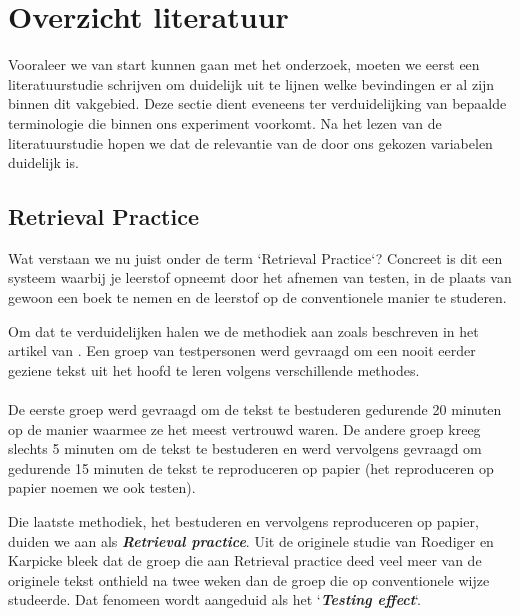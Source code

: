 \documentclass{hogent-article}
\newcommand{\boldit}[1]{\emph{\textbf{#1}}}
\begin{document}
\section{Overzicht literatuur}

Vooraleer we van start kunnen gaan met het onderzoek, moeten we eerst een literatuurstudie schrijven om duidelijk uit te lijnen welke bevindingen er al zijn binnen dit vakgebied. Deze sectie dient eveneens ter verduidelijking van bepaalde terminologie die binnen ons experiment voorkomt. Na het lezen van de literatuurstudie hopen we dat de relevantie van de door ons gekozen variabelen duidelijk is.

\subsection{Retrieval Practice}
\label{RetrievalPractice}
Wat verstaan we nu juist onder de term `Retrieval Practice`? Concreet is dit een systeem waarbij je leerstof opneemt door het afnemen van testen, in de plaats van gewoon een boek te nemen en de leerstof op de conventionele manier te studeren.\\
\par
\noindent
Om dat te verduidelijken halen we de methodiek aan zoals beschreven in het artikel van \textcite{Roediger_2006}. Een groep van testpersonen werd gevraagd om een nooit eerder geziene tekst uit het hoofd te leren volgens verschillende methodes.\\\\De eerste groep werd gevraagd om de tekst te bestuderen gedurende 20 minuten op de manier waarmee ze het meest vertrouwd waren. De andere groep kreeg slechts 5 minuten om de tekst te bestuderen en werd vervolgens gevraagd om gedurende 15 minuten de tekst te reproduceren op papier (het reproduceren op papier noemen we ook testen).\\

\par
\noindent
Die laatste methodiek, het bestuderen en vervolgens reproduceren op papier, duiden we aan als \boldit{Retrieval practice}. Uit de originele studie van Roediger en Karpicke bleek dat de groep die aan Retrieval practice deed veel meer van de originele tekst onthield na twee weken dan de groep die op conventionele wijze studeerde. Dat fenomeen wordt aangeduid als het `\boldit{Testing effect}`.
\end{document}
